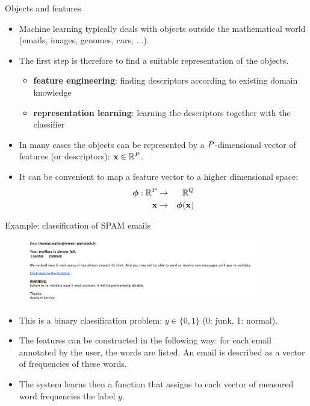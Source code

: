 \documentclass[xcolor=pdftex,dvipsnames,table]{beamer}
\begin{document}
\begin{frame}{Objects and features}
\begin{itemize}
\item Machine learning typically deals with objects outside the mathematical world (emails, images, genomes, cars, $\ldots$).
\item The first step is therefore to find a suitable representation of the objects.
\begin{itemize}
\item \textbf{feature engineering}: finding descriptors according to existing domain knowledge
\item \textbf{representation learning}: learning the descriptors together with the classifier
\end{itemize}
\item In many cases the objects can be represented by a $P$-dimensional vector of features (or descriptors): $\mathbf{x} \in \mathbb{R}^{P}$.
\item It can be convenient to map a feature vector to a higher dimensional space:
\begin{eqnarray}
\boldsymbol{\phi} : \mathbb{R}^{P} &\rightarrow & \mathbb{R}^Q \\
\mathbf{x} &\rightarrow &\boldsymbol{\phi} (\mathbf{x})
\end{eqnarray}
\end{itemize}
\end{frame}

\begin{frame}{Example: classification of SPAM emails}
\begin{figure}[htb]
\includegraphics[width=0.9\textwidth]{../graphics/SPAM_mail.png}
\end{figure}
\begin{itemize}
	\item This is a binary classification problem: $y \in \{0,1\}$ (0: junk, 1: normal).
	\item The features can be constructed in the following way: for each email annotated by the user, the words are listed. An email is described as a vector of frequencies of these words.
	\item The system learns then a function that assigns to each vector of measured word frequencies the label $y$.
\end{itemize}
\end{frame}
\end{document}
